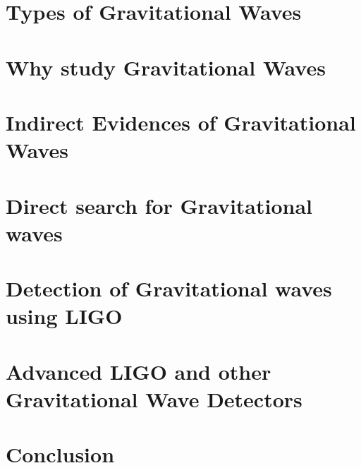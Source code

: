 \documentclass[11pt, a4paper]{article}
\begin{document}
\section{Types of Gravitational Waves}


\section{Why study Gravitational Waves}


\section{Indirect Evidences of Gravitational Waves}


\section{Direct search for Gravitational waves}







\section{Detection of Gravitational waves using LIGO }



\section{Advanced LIGO and other Gravitational Wave Detectors}


\section{Conclusion}


\printbibliography
\end{document}
